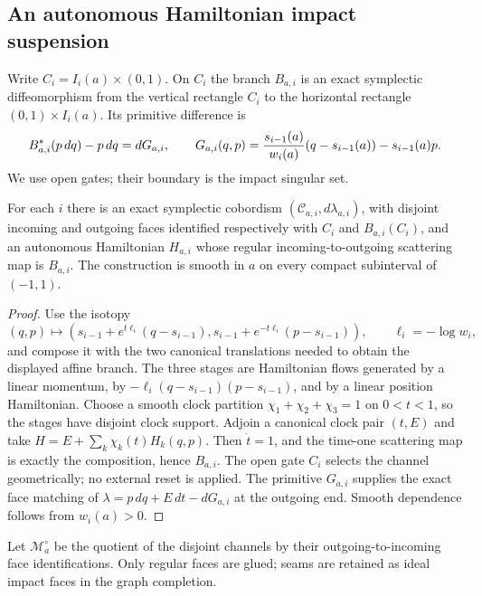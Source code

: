 \subsection{An autonomous Hamiltonian impact suspension}

Write \(C_i=I_i(a)\times(0,1)\).  On \(C_i\) the branch \(B_{a,i}\) is an
exact symplectic diffeomorphism from the vertical rectangle \(C_i\) to the
horizontal rectangle \((0,1)\times I_i(a)\).  Its primitive difference is
\[
 B_{a,i}^*(p\,dq)-p\,dq=dG_{a,i},
 \qquad
 G_{a,i}(q,p)=
 {s_{i-1}(a)\over w_i(a)}(q-s_{i-1}(a))
 -s_{i-1}(a)p .
\]
We use open gates; their boundary is the impact singular set.

\begin{lemma}
\label{lem:r14-a1-channel}
For each \(i\) there is an exact symplectic cobordism
\((\mathcal C_{a,i},d\lambda_{a,i})\), with disjoint incoming and outgoing
faces identified respectively with \(C_i\) and \(B_{a,i}(C_i)\), and an
autonomous Hamiltonian \(H_{a,i}\) whose regular incoming-to-outgoing
scattering map is \(B_{a,i}\).  The construction is smooth in \(a\) on every
compact subinterval of \((-1,1)\).
\end{lemma}

\begin{proof}
Use the isotopy
\[
 (q,p)\mapsto
 \left(s_{i-1}+e^{t\ell_i}(q-s_{i-1}),
       s_{i-1}+e^{-t\ell_i}(p-s_{i-1})\right),
 \qquad \ell_i=-\log w_i,
\]
and compose it with the two canonical translations needed to obtain the
displayed affine branch.  The three stages are Hamiltonian flows generated by
a linear momentum, by \(-\ell_i(q-s_{i-1})(p-s_{i-1})\), and by a linear
position Hamiltonian.  Choose a smooth clock partition
\(\chi_1+\chi_2+\chi_3=1\) on \(0<t<1\), so the stages have disjoint clock
support.  Adjoin a canonical clock pair \((t,E)\) and take
\(H=E+\sum_k\chi_k(t)H_k(q,p)\).  Then \(\dot t=1\), and the time-one
scattering map is exactly the composition, hence \(B_{a,i}\).  The open gate
\(C_i\) selects the channel geometrically; no external reset is applied.
The primitive \(G_{a,i}\) supplies the exact face matching of
\(\lambda=p\,dq+E\,dt-dG_{a,i}\) at the outgoing end.  Smooth dependence
follows from \(w_i(a)>0\).
\end{proof}

Let \(\mathcal M_a^\circ\) be the quotient of the disjoint channels by their
outgoing-to-incoming face identifications.  Only regular faces are glued;
seams are retained as ideal impact faces in the graph completion.

